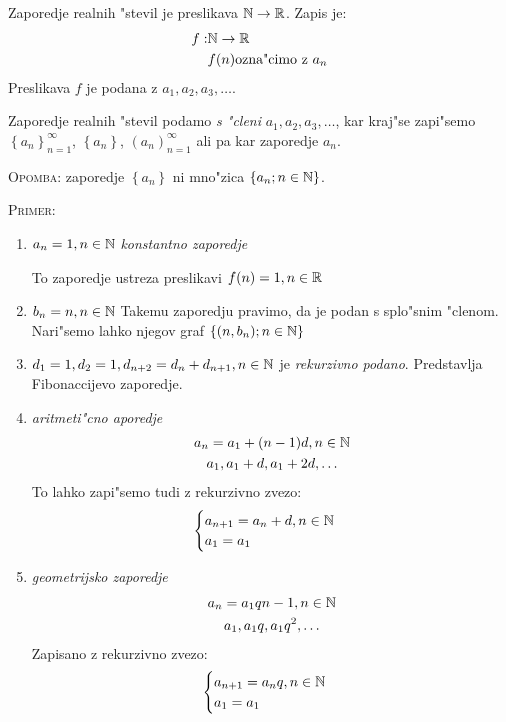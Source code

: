  Zaporedje realnih "stevil je preslikava $\mathbb{N} \rightarrow \mathbb{R}$. Zapis je:
\begin{align*}
f: &\mathbb{N} \rightarrow \mathbb{R}\\
&f(n) \text{ozna"cimo z $a_n$}
\end{align*}
Preslikava $f$ je podana z $a_1, a_2, a_3, \ldots$.

Zaporedje realnih "stevil podamo \emph{s "cleni} $a_1, a_2, a_3, \ldots$, kar kraj"se zapi"semo $\left\{a_n\right\}_{n=1}^\infty$, $\left\{a_n\right\}$,  $\left(a_n\right)_{n=1}^\infty$ ali pa kar zaporedje $a_n$.

\textsc{Opomba}: zaporedje $\left\{a_n\right\}$ ni mno"zica $\left\{a_n; n \in \mathbb{N} \right\}$.

\textsc{Primer:}
\begin{enumerate}[1)]
	\item $a_n = 1, n \in \mathbb{N}$ \emph{konstantno zaporedje}
	
	To zaporedje ustreza preslikavi $f(n) = 1, n \in \mathbb{R}$
	
	\item $b_n = n, n \in \mathbb{N}$ Takemu zaporedju pravimo, da je podan s splo"snim "clenom. Nari"semo lahko njegov graf $\left\{(n, b_n); n \in \mathbb{N} \right\}$
	
	\item $d_1=1, d_2=1, d_{n+2} = d_n + d_{n+1}, n \in \mathbb{N}$ je \emph{rekurzivno podano}. Predstavlja Fibonaccijevo zaporedje.
	
	\item \emph{aritmeti"cno aporedje}
	\begin{gather*}
	a_n = a_1 + (n-1)d, n \in \mathbb{N}\\
	a_1, a_1 + d, a_1 + 2d, \ldots
	\end{gather*}
	To lahko zapi"semo tudi z rekurzivno zvezo:
	\begin{equation*}
	\begin{cases}
	a_{n+1} = a_n + d, n \in \mathbb{N}\\
	a_1 = a_1
	\end{cases}
	\end{equation*}
	
	\item \emph{geometrijsko zaporedje}
	\begin{gather*}
		a_n = a_1 q{n-1}, n \in \mathbb{N}\\
		a_1, a_1 q, a_1 q^2, \ldots
	\end{gather*}
	Zapisano z rekurzivno zvezo:
	\begin{equation*}
	\begin{cases}
	a_{n+1} = a_n q, n \in \mathbb{N} \\
	a_1 = a_1
	\end{cases}
	\end{equation*}
\end{enumerate}

